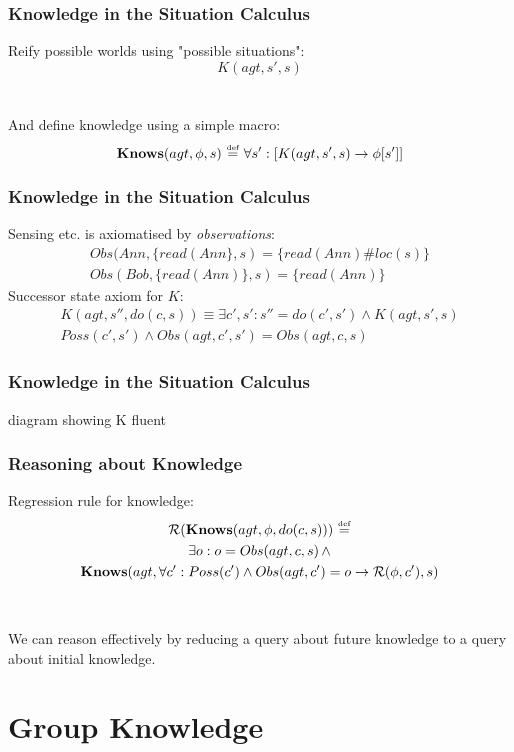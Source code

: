 \documentclass[compress]{beamer}
\newcommand{\isdef}{\hbox{$\stackrel{\mbox{\tiny def}}{=}$}}
\newcommand{\Reg}{\mathcal{R}}
\newcommand{\Knows}{\mathbf{Knows}}
\begin{document}
\begin{frame}
\frametitle{Knowledge in the Situation Calculus}
Reify possible worlds using "possible situations":
\begin{equation*}
 K(agt,s',s)
\end{equation*}
\ \\
\ \\
And define knowledge using a simple macro:
\begin{equation*}
\Knows(agt,\phi,s)\,\,\isdef\,\,\forall s': \left[ K(agt,s',s) \rightarrow \phi[s']\right]
\end{equation*}
\end{frame}

\begin{frame}
\frametitle{Knowledge in the Situation Calculus}
Sensing etc. is axiomatised by \emph{observations}:
\begin{gather*}
Obs(Ann,\{read(Ann\},s) = \{read(Ann)\#loc(s)\}\\
Obs(Bob,\{read(Ann)\},s) = \{read(Ann)\}
\end{gather*}
Successor state axiom for $K$:
\begin{multline*}
K(agt,s'',do(c,s)) \equiv \exists c',s': s'' = do(c',s') \wedge K(agt,s',s)\\
  Poss(c',s') \wedge Obs(agt,c',s') = Obs(agt,c,s)
\end{multline*}
\end{frame}

\begin{frame}
\frametitle{Knowledge in the Situation Calculus}
diagram showing K fluent
\end{frame}

\begin{frame}
\frametitle{Reasoning about Knowledge}
Regression rule for knowledge:
\begin{multline*}
\Reg(\Knows(agt,\phi,do(c,s)))\,\,\isdef \\
  \exists o: o = Obs(agt,c,s)\,\wedge \\
  \Knows(agt,\forall c': Poss(c')\wedge Obs(agt,c')=o \rightarrow \Reg(\phi,c'),s)
\end{multline*}
\ \\
\ \\
We can reason effectively by reducing a query about future knowledge to a query about initial knowledge.
\end{frame}

\section{Group Knowledge}
\end{document}
